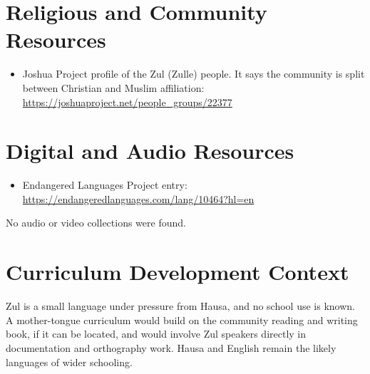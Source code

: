 \documentclass[12pt]{article}
\begin{document}
\section{Religious and Community Resources}
\begin{itemize}
\item Joshua Project profile of the Zul (Zulle) people. It says the community is split between Christian and Muslim affiliation: \url{https://joshuaproject.net/people_groups/22377}
\end{itemize}

\section{Digital and Audio Resources}
\begin{itemize}
\item Endangered Languages Project entry: \url{https://endangeredlanguages.com/lang/10464?hl=en}
\end{itemize}
No audio or video collections were found.

\section{Curriculum Development Context}
Zul is a small language under pressure from Hausa, and no school use is known. A mother-tongue curriculum would build on the community reading and writing book, if it can be located, and would involve Zul speakers directly in documentation and orthography work. Hausa and English remain the likely languages of wider schooling.
\end{document}
